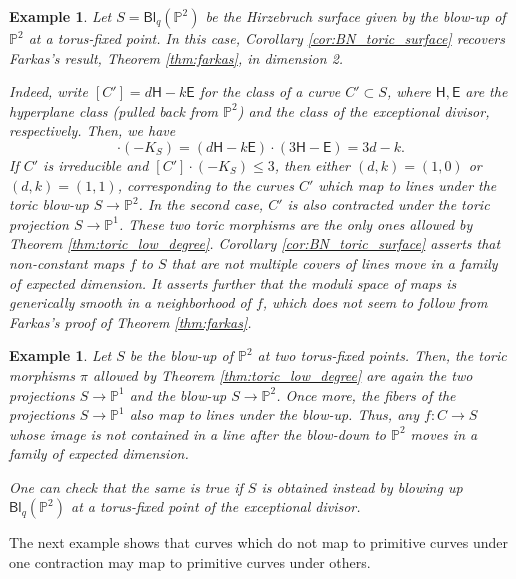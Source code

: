 \documentclass[12pt]{amsart}
\def\E{\mathsf{E}}
\def\H{\mathsf{H}}
\def\P{\mathbb{P}}
\def\bP{\mathbb{P}}
\newtheorem{example}[definition]{Example}
\newcommand{\Bl}{{\mathsf{Bl}}}
\begin{document}
\begin{example}
Let $S=\Bl_q(\P^2)$ be the Hirzebruch surface given by the blow-up of $\P^2$ at a torus-fixed point. In this case, Corollary \ref{cor:BN_toric_surface} recovers Farkas's result, Theorem \ref{thm:farkas}, in dimension 2.

Indeed, write $[C']=d\H-k\E$ for the class of a curve $C'\subset S$, where $\H,\E$ are the hyperplane class (pulled back from $\bP^2$) and the class of the exceptional divisor, respectively. Then, we have
\begin{equation*}
    [C']\cdot(-K_S)=(d\H-k\E)\cdot(3\H-\E)=3d-k.
\end{equation*}
If $C'$ is irreducible and $[C']\cdot(-K_S)\le 3$, then either $(d,k)=(1,0)$ or $(d,k)=(1,1)$, corresponding to the curves $C'$ which map to lines under the toric blow-up $S\to \bP^2$. In the second case, $C'$ is also contracted under the toric projection $S\to\bP^1$. These two toric morphisms are the only ones allowed by Theorem \ref{thm:toric_low_degree}. Corollary \ref{cor:BN_toric_surface} asserts that non-constant maps $f$ to $S$ that are not multiple covers of lines move in a family of expected dimension. It asserts further that the moduli space of maps is generically smooth in a neighborhood of $f$, which does not seem to follow from Farkas's proof of Theorem \ref{thm:farkas}.
\end{example}

\begin{example}
    Let $S$ be the blow-up of $\P^2$ at two torus-fixed points. Then, the toric morphisms $\pi$ allowed by Theorem \ref{thm:toric_low_degree} are again the two projections $S\to\P^1$ and the blow-up $S\to\P^2$. Once more, the fibers of the projections $S\to \P^1$ also map to lines under the blow-up. Thus, any $f:C\to S$ whose image is not contained in a line after the blow-down to $\P^2$ moves in a family of expected dimension. 
    
    One can check that the same is true if $S$ is obtained instead by blowing up $\Bl_q(\P^2)$ at a torus-fixed point of the exceptional divisor.
    
\end{example}

The next example shows that curves which do not map to primitive curves under one contraction may map to primitive curves under others.
\end{document}
